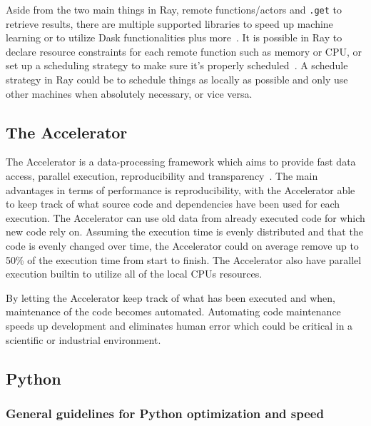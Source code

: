 \documentclass[12pt, a4paper]{article}
\begin{document}
Aside from the two main things in Ray, remote functions/actors and \texttt{.get} to retrieve results, there are multiple supported libraries to speed up machine learning or to utilize Dask functionalities plus more~\cite{ray:RaySGD, ray:Rayrllib, ray:RayTune, ray:RaySklearn, ray:DaskOnRay}. 
It is possible in Ray to declare resource constraints for each remote function such as memory or CPU, or set up a scheduling strategy to make sure it's properly scheduled~\cite{ray:Resources, ray:PlacementGroup}.
A schedule strategy in Ray could be to schedule things as locally as possible and only use other machines when absolutely necessary, or vice versa.

\subsection{The Accelerator}

The Accelerator is a data-processing framework which aims to provide fast data access, parallel execution, reproducibility and transparency~\cite{exax:Accelerator}.
The main advantages in terms of performance is reproducibility, with the Accelerator able to keep track of what source code and dependencies have been used for each execution.
The Accelerator can use old data from already executed code for which new code rely on.
Assuming the execution time is evenly distributed and that the code is evenly changed over time, the Accelerator could on average remove up to 50\% of the execution time from start to finish.
The Accelerator also have parallel execution builtin to utilize all of the local CPUs resources.

By letting the Accelerator keep track of what has been executed and when, maintenance of the code becomes automated.
Automating code maintenance speeds up development and eliminates human error which could be critical in a scientific or industrial environment.

\subsection{Python}
\subsubsection{General guidelines for Python optimization and speed}\label{guidelines}
\end{document}
